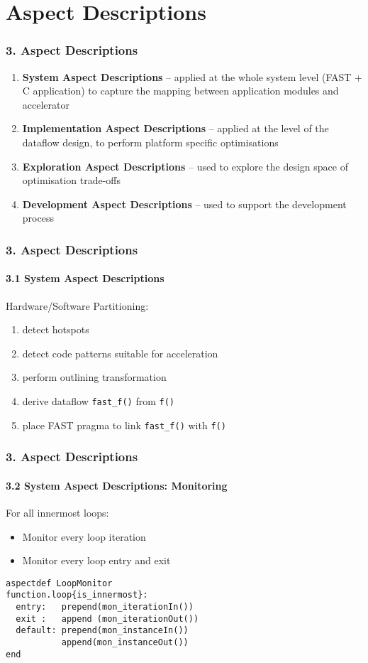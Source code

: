 \section{Aspect Descriptions}
\begin{frame}
  \frametitle{3. Aspect Descriptions}
  \begin{enumerate}
  \setlength{\itemsep}{15pt}
  \item \textbf{System Aspect Descriptions} -- applied at the whole
    system level (FAST + C application) to capture the mapping
    between application modules and accelerator
  \item \textbf{Implementation Aspect Descriptions} -- applied at the
    level of the dataflow design, to perform platform specific
    optimisations
  \item \textbf{Exploration Aspect Descriptions} -- used to explore the
    design space of optimisation trade-offs
  \item \textbf{Development Aspect Descriptions}  -- used to support
    the development process
  \end{enumerate}
\end{frame}

\begin{frame}
  \frametitle{3. Aspect Descriptions}
  \framesubtitle{3.1 System Aspect Descriptions}
  Hardware/Software Partitioning:
  \begin{enumerate}
  \setlength{\itemsep}{10pt}
  \item detect hotspots
  \item detect code patterns suitable for acceleration
  \item perform outlining transformation
  \item derive dataflow \texttt{fast\_f()} from \texttt{f()}
  \item place FAST pragma to link \texttt{fast\_f()} with \texttt{f()}
  \end{enumerate}
\end{frame}


\begin{frame}[fragile]
  \frametitle{3. Aspect Descriptions}
  \framesubtitle{3.2 System Aspect Descriptions: Monitoring}
  For all innermost loops:
  \begin{itemize}
  \item Monitor every loop iteration
  \item Monitor every loop entry and exit
  \end{itemize}
  \begin{lstlisting}[label=lst:label, style=lara]
aspectdef LoopMonitor
function.loop{is_innermost}:
  entry:   prepend(mon_iterationIn())
  exit :   append (mon_iterationOut())
  default: prepend(mon_instanceIn())
           append(mon_instanceOut())
end
  \end{lstlisting}
\end{frame}

